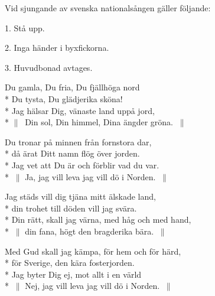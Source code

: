 

\pagestyle{Patriotiska sånger}









Vid sjungande av svenska nationalsången gäller följande:

1. Stå upp.

2. Inga händer i byxfickorna.

3. Huvudbonad avtages. 

\begin{SongText}
\begin{Verse}
Du gamla, Du fria, Du fjällhöga nord\\*%
Du tysta, Du glädjerika sköna!\\*%
Jag hälsar Dig, vänaste land uppå jord,\\*%
$\|\:$ Din sol, Din himmel, Dina ängder gröna. $\:\|$
\end{Verse}
\begin{Verse}
Du tronar på minnen från fornstora dar,\\*%
då ärat Ditt namn flög över jorden.\\*%
Jag vet att Du är och förblir vad du var.\\*%
$\:\|$ Ja, jag vill leva jag vill dö i Norden. $\:\|$
\end{Verse}
\begin{Verse}
Jag städs vill dig tjäna mitt älskade land,\\*%
din trohet till döden vill jag svära.\\*%
Din rätt, skall jag värna, med håg och med hand,\\*%
$\:\|$ din fana, högt den bragderika bära. $\:\|$
\end{Verse}
\begin{Verse}
Med Gud skall jag kämpa, för hem och för härd,\\*%
för Sverige, den kära fosterjorden.\\*%
Jag byter Dig ej, mot allt i en värld\\*%
$\:\|$ Nej, jag vill leva jag vill dö i Norden. $\:\|$
\end{Verse}
\end{SongText}

